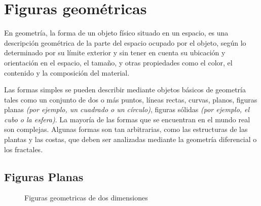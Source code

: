 \documentclass{article}
\begin{document}
	\section*{Figuras geom\'etricas}
	En geometr\'ia, la forma de un objeto f\'isico situado en un espacio, es una descripci\'on 
	geom\'etrica de la parte del espacio ocupado por el objeto, seg\'un lo determinado por 
	su l\'imite exterior y sin tener en cuenta su ubicaci\'on y orientaci\'on en el espacio, 
	el tama\~no, y otras propiedades como el color, el contenido y la composici\'on del 
	material.\newline
  
	Las formas simples se pueden describir mediante objetos b\'asicos de geometr\'ia tales 
	como un conjunto de dos o m\'as puntos, l\'ineas rectas, curvas, planos, figuras planas 
	\textit{(por ejemplo, un cuadrado o un c\'irculo)}, figuras s\'olidas \textit{(por ejemplo, el cubo o la esfera)}. 
	La mayor\'ia de las formas que se encuentran en el mundo real son complejas. Algunas formas son 
	tan arbitrarias, como las estructuras de las plantas y las costas, que deben ser analizadas 
	mediante la geometr\'ia diferencial o los fractales.

	\subsection*{Figuras Planas}

	\begin{figure}[!ht]
		\centering
		\caption{Figuras geometricas de dos dimensiones}
	\end{figure}
\end{document}
